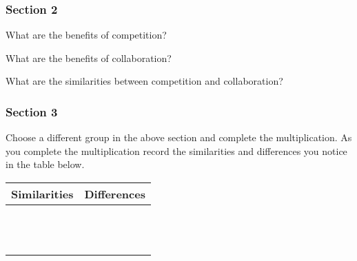 \documentclass[12pt]{article}
\newcommand{\ssol}{\vspace{3em}}
\begin{document}
\begin{appendices}
\subsubsection*{Section 2}
\begin{question}
What are the benefits of competition?
\end{question}\ssol

\begin{question}
What are the benefits of collaboration?
\end{question}\ssol

\begin{question}
What are the similarities between competition and collaboration?
\end{question}\ssol

\pagebreak
 
\subsubsection*{Section 3}
\begin{question}
Choose a different group in the above section and complete the multiplication.  As you complete the multiplication record the similarities and differences you notice in the table below.
\end{question}

\begin{table}[h!]
\begin{tabular}{p{4cm}|p{4cm}}
Similarities & Differences \\ \hline & \\ & \\ & \\ & \\ & \\ & \\ & \\ & \\ & \\ & \\ & \\ & \\
\end{tabular}
\end{table}


\end{appendices}
\end{document}
